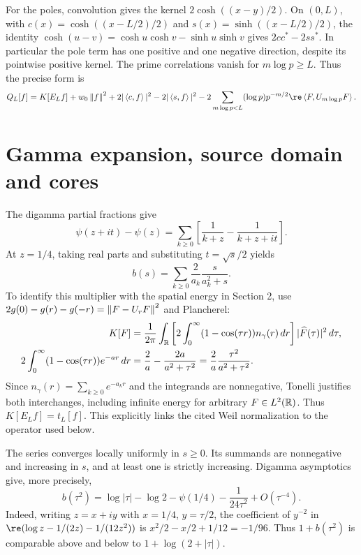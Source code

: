 For the poles, convolution gives the kernel $2\cosh((x-y)/2)$.
On $(0,L)$, with $c(x)=\cosh((x-L/2)/2)$ and
$s(x)=\sinh((x-L/2)/2)$, the identity
$\cosh(u-v)=\cosh u\cosh v-\sinh u\sinh v$ gives
$2cc^*-2ss^*$. In particular the pole term has one positive and one
negative direction, despite its pointwise positive kernel.
The prime correlations vanish for $m\log p\ge L$. Thus the precise
form is
\begin{equation}\label{d:full-form}
Q_L[f]=K[E_Lf]+w_0\norm f^2+2|\ip c f|^2-2|\ip s f|^2
-2\sum_{m\log p<L}(\log p)p^{-m/2}\re\ip F{U_{m\log p}F}.
\end{equation}

\section{Gamma expansion, source domain and cores}
The digamma partial fractions \cite{DLMF} give
\[
\psi(z+it)-\psi(z)=\sum_{k\ge0}
\left[\frac1{k+z}-\frac1{k+z+it}\right].
\]
At $z=1/4$, taking real parts and substituting $t=\sqrt{s}/2$ yields
\begin{equation}\label{d:gamma-series}
b(s)=\sum_{k\ge0}\frac2{a_k}\frac{s}{a_k^2+s}.
\end{equation}
To identify this multiplier with the spatial energy in Section 2, use
$2g(0)-g(r)-g(-r)=\left\lVert F-U_rF\right\rVert^2$ and Plancherel:
\begin{align}
K[F]&=\frac1{2\pi}\int_\mathbb R
\left[2\int_0^\infty(1-\cos(\tau r))n_\gamma(r)\,dr\right]
|\widehat F(\tau)|^2\,d\tau,\label{d:gamma-fourier}\\
2\int_0^\infty(1-\cos(\tau r))e^{-ar}\,dr
&=\frac2a-\frac{2a}{a^2+\tau^2}
=\frac2a\frac{\tau^2}{a^2+\tau^2}.\notag
\end{align}
Since $n_\gamma(r)=\sum_{k\ge0}e^{-a_kr}$ and the integrands are
nonnegative, Tonelli justifies both interchanges, including infinite
energy for arbitrary $F\in L^2(\mathbb R)$. Thus
$K[E_Lf]=t_L[f]$. This explicitly links the cited Weil normalization
to the operator used below.

The series converges locally uniformly in $s\ge0$. Its summands are
nonnegative and increasing in $s$, and at least one is strictly increasing.
Digamma asymptotics give, more precisely,
\[
b(\tau^2)=\log|\tau|-\log2-\psi(1/4)
-\frac1{24\tau^2}+O(\tau^{-4}).
\]
Indeed, writing $z=x+iy$ with $x=1/4$, $y=\tau/2$, the coefficient
of $y^{-2}$ in $\re(\log z-1/(2z)-1/(12z^2))$ is
$x^2/2-x/2+1/12=-1/96$.
Thus $1+b(\tau^2)$ is comparable above and below to
$1+\log(2+|\tau|)$.

